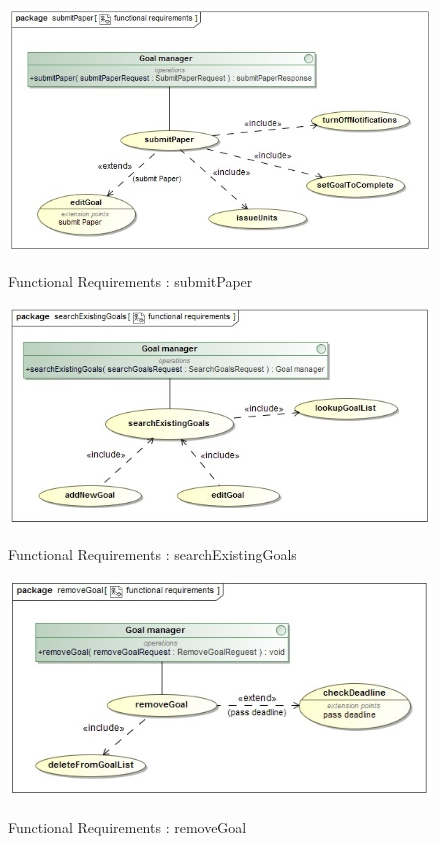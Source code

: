 \documentclass{article}
\begin{document}
		\begin{figure}[H]
			\includegraphics[width=\textwidth]{Ruan_Diagrams/submitPaper_functionalRequirements.jpg}  \\
			\caption{Functional Requirements : submitPaper}
		\end{figure}
		\begin{figure}[H]
			\includegraphics[width=\textwidth]{Ruan_Diagrams/searchExistingGoals_functionalRequirements.jpg}  \\
			\caption{Functional Requirements : searchExistingGoals}
		\end{figure}
		\begin{figure}[H]
			\includegraphics[width=\textwidth]{Ruan_Diagrams/removeGoal_functionalRequirements.jpg}  \\
			\caption{Functional Requirements : removeGoal}
		\end{figure}
\end{document}
